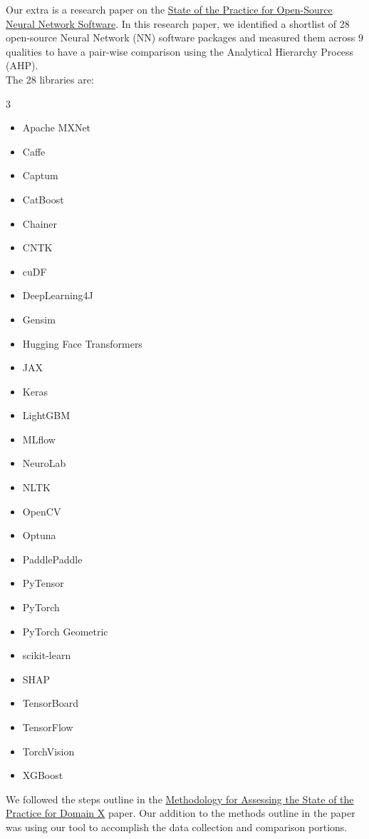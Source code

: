 \documentclass{article}
\begin{document}
Our extra is a research paper on the \href{https://github.com/thaafei/DomainX/blob/main/docs/ResearchReport/StateOfPractice_NLP.pdf}{State of the Practice for Open-Source Neural Network Software}. In this research paper, we identified a shortlist of 28 open-source Neural Network (NN) software packages and measured them across 9 qualities to have a pair-wise comparison using the Analytical Hierarchy Process (AHP).
\\The 28 libraries are:
\begin{multicols}{3}
\begin{itemize}
    \item Apache MXNet
    \item Caffe
    \item Captum
    \item CatBoost
    \item Chainer
    \item CNTK
    \item cuDF
    \item DeepLearning4J
    \item Gensim
    \item Hugging Face Transformers
    \item JAX
    \item Keras
    \item LightGBM
    \item MLflow
    \item NeuroLab
    \item NLTK
    \item OpenCV
    \item Optuna
    \item PaddlePaddle
    \item PyTensor
    \item PyTorch
    \item PyTorch Geometric
    \item scikit-learn
    \item SHAP
    \item TensorBoard
    \item TensorFlow
    \item TorchVision
    \item XGBoost
\end{itemize}
\end{multicols}
We followed the steps outline in the \href{https://arxiv.org/pdf/2110.11575}{Methodology for Assessing the State of the
Practice for Domain X} paper. Our addition to the methods outline in the paper was using our tool to accomplish the data collection and comparison portions.
\end{document}
